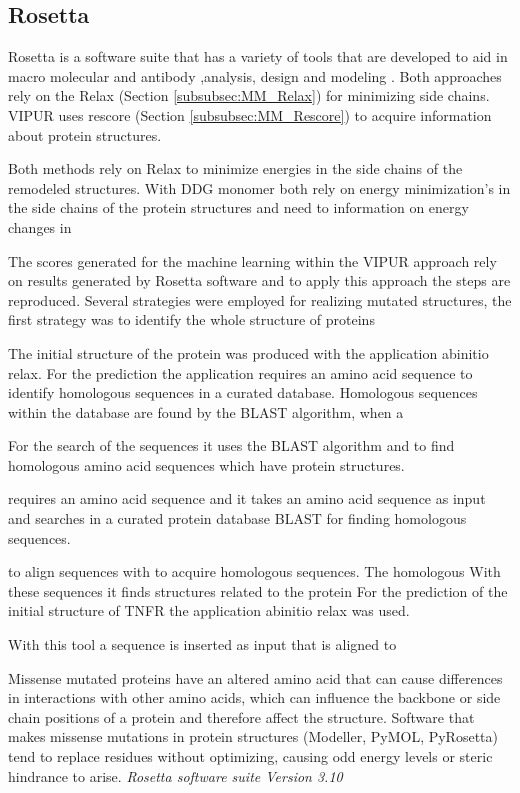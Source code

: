\subsection{Rosetta}
Rosetta is a software suite that has a variety of tools that are developed to aid in macro molecular and antibody ,analysis, design and modeling \cite{}.
Both approaches rely on the Relax (Section \ref{subsubsec:MM_Relax}) for minimizing side chains. VIPUR uses rescore (Section \ref{subsubsec:MM_Rescore}) to acquire information about protein structures.

Both methods rely on Relax  to minimize energies in the side chains of the remodeled structures. With  DDG monomer  both rely on energy minimization's  in the side chains of the protein structures and need to information on energy changes in 

The scores generated for the machine learning within the VIPUR approach rely on results generated by Rosetta software and to apply this approach the steps are reproduced.  
Several strategies were employed for realizing mutated structures, the first strategy was to identify the whole structure of proteins


 The initial structure of the protein was produced with the application abinitio relax. For the prediction the application requires an amino acid sequence to identify homologous sequences in a curated database. Homologous sequences within the database are found by the BLAST algorithm, when a

For the search of the sequences it uses the BLAST algorithm and to find homologous amino acid sequences which have protein structures.

requires an amino acid sequence and  it takes an amino acid sequence as input and searches in a curated protein database BLAST for finding homologous sequences. 


to align sequences with to acquire homologous sequences.  The homologous With these sequences it finds structures related to the protein
For the prediction of the initial structure of TNFR the application abinitio relax was used. 

With this tool a sequence is inserted as input that is aligned to 


Missense mutated proteins have an altered amino acid that can cause differences in interactions with other amino acids, which can influence the backbone or side chain positions of a protein and therefore affect the structure. Software that makes missense mutations in protein structures (Modeller, PyMOL, PyRosetta) tend to replace residues without optimizing, causing odd energy levels or steric hindrance to arise.
\label{subsec:MM_Rosetta}
\newline
\textit{Rosetta software suite Version 3.10}

